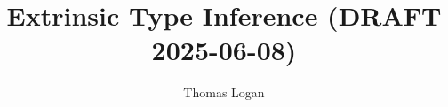 \documentclass[acmsmall]{acmart}
\title{Extrinsic Type Inference (DRAFT 2025-06-08)}
\author{Thomas Logan}
\newcounter{pdc}
\newcounter{sdc}
\theoremstyle{definition}
\begin{document}
\newcommand{\stoprule}{
  \addlinespace[2pt]
  \toprule
  \addlinespace[5pt]
}

\newcommand{\sbottomrule}{
  \addlinespace[2pt]
  \bottomrule
  \addlinespace[2pt]
}

\newcommand{\smidrule}[1]{
  \addlinespace[2pt]
  \midrule
  \addlinespace[2pt]
}

\newcommand{\scmidrule}[1]{
  \addlinespace[2pt]
  \cmidrule{#1}
  \addlinespace[2pt]
}


\newcommand{\sline}{
  \arrayrulecolor{gray!50}
  \specialrule{0.4pt}{2pt}{2pt}
  \arrayrulecolor{black}
}

\newcommand{\pdc}{\stepcounter{pdc}\arabic{pdc}}
\newcommand{\sdc}{\stepcounter{sdc}\arabic{sdc}}

\newcommand{\Par}[1]{\paragraph{\textbf{#1}}}
\newcommand{\J}[1]{\texttt{\fontfamily{pcr}\selectfont #1}}
\newcommand{\lab}[1]{\text{\color{Gray}\ [#1]}}
\newcommand{\entails}{\vdash}
\newcommand{\satisfies}{\vDash}
\newcommand{\given}{\dashv}
\newcommand{\with}{\ \diamond\ }
\newcommand{\notfree}{\ \#\ }
\newcommand{\consis}{\ \star}
\newcommand{\safe}{\ \checkmark}
\newcommand{\relational}{\ \Re}


\newcommand{\pass}{\text{\scriptsize \color{Green} \ding{51}}}
\newcommand{\assisted}{\text{\scriptsize \color{Purple} \ding{45}}}
\newcommand{\fail}{\text{\scriptsize \color{red} \ding{55}}}

\newcommand{\unique}{\ \dagger}

\newcommand{\factorsinto}{\Vdash}


\newcommand{\allsafe}{\ \Re\checkmark}

\newcommand{\qua}{\ .\ }



\newcommand{\ignore}{\varnothing}
\newcommand{\dTheta}{\dot{\Theta}}
\newcommand{\closed}{\bullet}
\newcommand{\local}{\blacktriangle}
\newcommand{\open}{\circ}



\newcommand{\up}{\ \land\ }
\newcommand{\down}{\ \lor\ }


\newcommand{\multi}[1]{\widebar{\ #1\ }}
\newcommand{\hastype}{:}
\newcommand{\pattype}{\ \lozenge\ }
\newcommand{\liftfun}{:}
\end{document}
